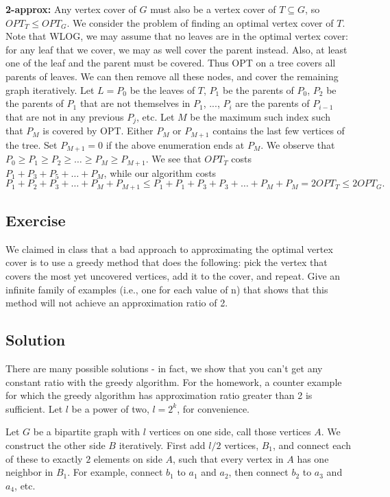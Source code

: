 \documentclass{article}
\newcounter{counter}
\newcommand{\Exercise}{Exercise \stepcounter{counter}\thecounter}
\begin{document}
    \vspace{3mm}
    \textbf{2-approx:} Any vertex cover of $G$ must also be a vertex cover of $T \subseteq G$, so $OPT_{T} \leq OPT_{G}$. We consider the problem of finding an optimal vertex cover of $T$. Note that WLOG, we may assume that no leaves are in the optimal vertex cover: for any leaf that we cover, we may as well cover the parent instead. Also, at least one of the leaf and the parent must be covered. Thus OPT on a tree covers all parents of leaves. We can then remove all these nodes, and cover the remaining graph iteratively. Let $L = P_0$ be the leaves of $T$, $P_1$ be the parents of $P_0$, $P_2$ be the parents of $P_1$ that are not themselves in $P_1$, ..., $P_i$ are the parents of $P_{i-1}$ that are not in any previous $P_j$, etc. Let $M$ be the maximum such index such that $P_M$ is covered by OPT. Either $P_M$ or $P_{M+1}$ contains the last few vertices of the tree. Set $P_{M+1} = 0$ if the above enumeration ends at $P_M$. We observe that $P_0 \geq P_1 \geq P_2 \geq \ldots \geq P_M \geq P_{M+1}$. We see that $OPT_{T}$ costs $P_1 + P_3 + P_5 + \ldots + P_M$, while our algorithm costs $$P_1 + P_2 + P_3+ \ldots + P_M + P_{M+1} \leq P_1 + P_1 + P_3 + P_3 + \ldots + P_M + P_M= 2 OPT_{T} \leq 2 OPT_{G}.$$
  
\subsection*{\Exercise}
    We claimed in class that a bad approach to approximating the optimal vertex cover is to use a greedy method that does the following: pick the vertex that covers the most yet uncovered vertices, add it to the cover, and repeat. Give an infinite family of examples (i.e., one for each value of n) that shows that this method will not achieve an approximation ratio of 2.


\subsection*{Solution}
    There are many possible solutions - in fact, we show that you can't get any constant ratio with the greedy algorithm. For the homework, a counter example for which the greedy algorithm has approximation ratio greater than 2 is sufficient. Let $l$ be a power of two, $l= 2^k$, for convenience.

    \vspace{3mm}
    Let $G$ be a bipartite graph with $l$ vertices on one side, call those vertices $A$. We construct the other side $B$ iteratively. First add $l/2$ vertices, $B_1$, and connect each of these to exactly $2$ elements on side $A$, such that every vertex in $A$ has one neighbor in $B_1$. For example, connect $b_1$ to $a_1$ and $a_2$, then connect $b_2$ to $a_3$ and $a_4$, etc.
\end{document}
